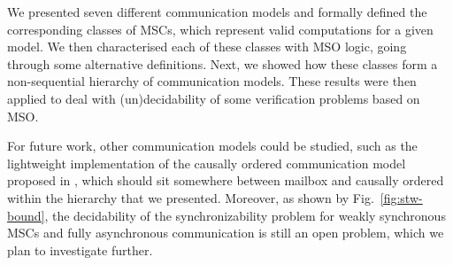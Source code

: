 We presented seven different communication models and formally defined the corresponding classes of MSCs, which represent valid computations for a given model. We then characterised each of these classes with MSO logic, going through some alternative definitions. Next, we showed how these classes form a non-sequential hierarchy of communication models. These results were then applied to deal with (un)decidability of some verification problems based on MSO. 

For future work, other communication models could be studied, such as the lightweight implementation of the causally ordered communication model proposed in \cite{DBLP:conf/dagstuhl/MatternF94}, which should sit somewhere between mailbox and causally ordered within the hierarchy that we presented. Moreover, as shown by Fig.~\ref{fig:stw-bound}, the decidability of the synchronizability problem for weakly synchronous MSCs and fully asynchronous communication is still an open problem, which we plan to investigate further.